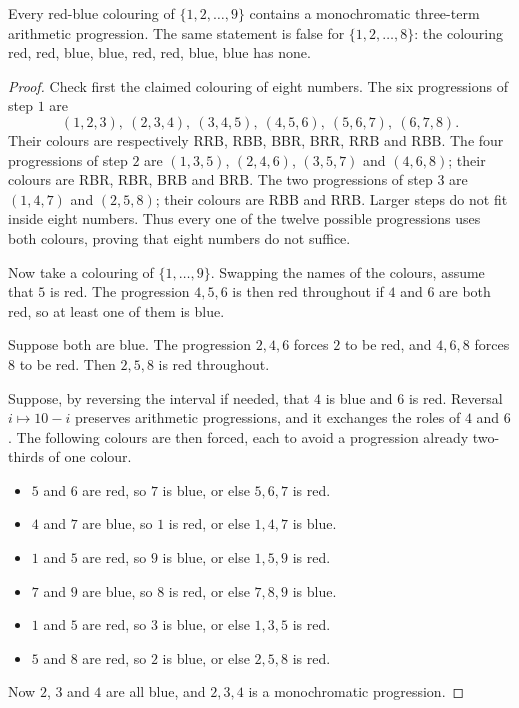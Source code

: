 \begin{theorem}\label{thm:vdw3}
Every red-blue colouring of $\{1,2,\ldots,9\}$ contains a monochromatic three-term arithmetic progression. The same statement is false for $\{1,2,\ldots,8\}$: the colouring red, red, blue, blue, red, red, blue, blue has none.
\end{theorem}
\begin{proof}
Check first the claimed colouring of eight numbers. The six progressions of step $1$ are
\[
 (1,2,3),\ (2,3,4),\ (3,4,5),\ (4,5,6),\ (5,6,7),\ (6,7,8).
\]
Their colours are respectively RRB, RBB, BBR, BRR, RRB and RBB. The four progressions of step $2$ are $(1,3,5)$, $(2,4,6)$, $(3,5,7)$ and $(4,6,8)$; their colours are RBR, RBR, BRB and BRB. The two progressions of step $3$ are $(1,4,7)$ and $(2,5,8)$; their colours are RBB and RRB. Larger steps do not fit inside eight numbers. Thus every one of the twelve possible progressions uses both colours, proving that eight numbers do not suffice.

Now take a colouring of $\{1,\ldots,9\}$. Swapping the names of the colours, assume that $5$ is red. The progression $4,5,6$ is then red throughout if $4$ and $6$ are both red, so at least one of them is blue.

Suppose both are blue. The progression $2,4,6$ forces $2$ to be red, and $4,6,8$ forces $8$ to be red. Then $2,5,8$ is red throughout.

Suppose, by reversing the interval if needed, that $4$ is blue and $6$ is red. Reversal $i\mapsto 10-i$ preserves arithmetic progressions, and it exchanges the roles of $4$ and $6$. The following colours are then forced, each to avoid a progression already two-thirds of one colour.
\begin{itemize}
\item $5$ and $6$ are red, so $7$ is blue, or else $5,6,7$ is red.
\item $4$ and $7$ are blue, so $1$ is red, or else $1,4,7$ is blue.
\item $1$ and $5$ are red, so $9$ is blue, or else $1,5,9$ is red.
\item $7$ and $9$ are blue, so $8$ is red, or else $7,8,9$ is blue.
\item $1$ and $5$ are red, so $3$ is blue, or else $1,3,5$ is red.
\item $5$ and $8$ are red, so $2$ is blue, or else $2,5,8$ is red.
\end{itemize}
Now $2$, $3$ and $4$ are all blue, and $2,3,4$ is a monochromatic progression.
\end{proof}

